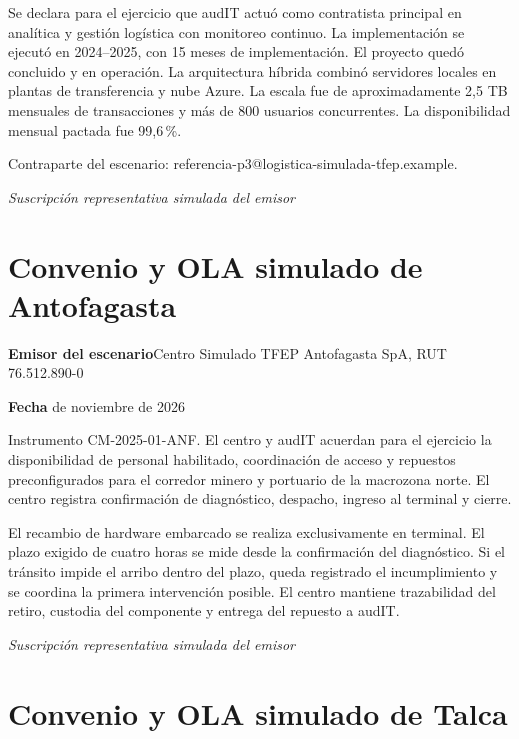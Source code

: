 Se declara para el ejercicio que audIT actuó como contratista principal en analítica y gestión logística con monitoreo continuo. La implementación se ejecutó en 2024--2025, con 15 meses de implementación. El proyecto quedó concluido y en operación. La arquitectura híbrida combinó servidores locales en plantas de transferencia y nube Azure. La escala fue de aproximadamente 2,5 TB mensuales de transacciones y más de 800 usuarios concurrentes. La disponibilidad mensual pactada fue 99,6\,\%.

Contraparte del escenario: referencia-p3@logistica-simulada-tfep.example.

\medskip
\noindent\textit{Suscripción representativa simulada del emisor}\par
\label{adm:ref-bicentenario-fin}

\clearpage
\section*{Convenio y OLA simulado de Antofagasta}\label{adm:ola-an}

\rotuloSimuladoSobreUno
\noindent\textbf{Emisor del escenario}\enspace Centro Simulado TFEP Antofagasta SpA, RUT 76.512.890-0\par
\noindent\textbf{Fecha} de noviembre de 2026\par
\medskip

Instrumento CM-2025-01-ANF. El centro y audIT acuerdan para el ejercicio la disponibilidad de personal habilitado, coordinación de acceso y repuestos preconfigurados para el corredor minero y portuario de la macrozona norte. El centro registra confirmación de diagnóstico, despacho, ingreso al terminal y cierre.

El recambio de hardware embarcado se realiza exclusivamente en terminal. El plazo exigido de cuatro horas se mide desde la confirmación del diagnóstico. Si el tránsito impide el arribo dentro del plazo, queda registrado el incumplimiento y se coordina la primera intervención posible. El centro mantiene trazabilidad del retiro, custodia del componente y entrega del repuesto a audIT.

\medskip
\noindent\textit{Suscripción representativa simulada del emisor}\par
\label{adm:ola-an-fin}

\clearpage
\section*{Convenio y OLA simulado de Talca}\label{adm:ola-ta}

